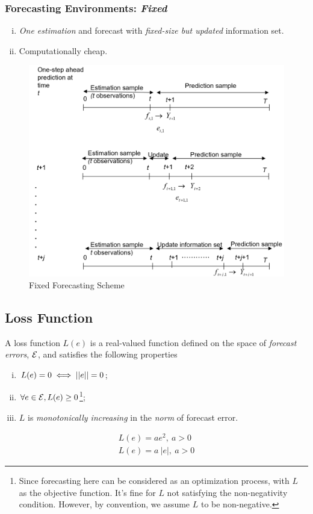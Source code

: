 \documentclass[11pt]{article}
\begin{document}
		\subsubsection{Forecasting Environments: \emph{Fixed}}
			\begin{enumerate}[(i)]
				\item \emph{One estimation} and forecast with \emph{fixed-size but updated} information set.
				\item Computationally cheap.
			\end{enumerate}
			\begin{figure}[H]
				\centering
				\includegraphics[width=0.5\linewidth]{figures/fixed_forecast}
				\caption{Fixed Forecasting Scheme}
			\end{figure}
	\subsection{Loss Function}
		\begin{definition}
			A loss function $L(e)$ is a real-valued function defined on the space of \emph{forecast errors}, $\mathcal{{E}}$, and satisfies the following properties
			\begin{enumerate}[(i)]
				\item $L(e) = 0 \iff \vert \vert {e} \vert \vert = 0$;
				\item $\forall e \in \mathcal{{E}}, L(e) \geq 0$\footnote{Since forecasting here can be considered as an optimization process, with $L$ as the objective function. It's fine for $L$ not satisfying the non-negativity condition. However, by convention, we assume $L$ to be non-negative.};
				\item $L$ is \emph{monotonically increasing} in the \emph{norm} of forecast error.
			\end{enumerate}
		\end{definition}
		
		\begin{example}[Symmetric Loss Functions with $\mc{E} = \R$]
			\begin{align}
				L(e) = a e^2,\ a > 0 \\
				L(e) = a\ |e|,\ a > 0
			\end{align}
		\end{example}
		
\end{document}
